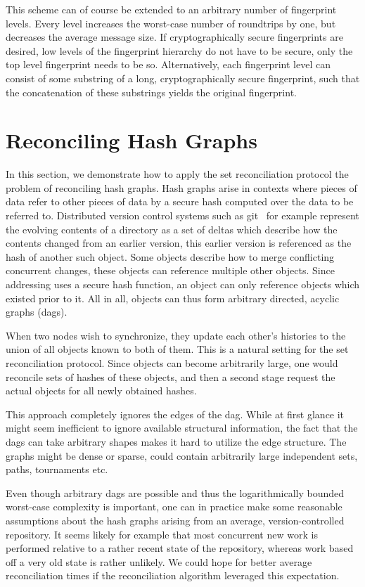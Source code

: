 This scheme can of course be extended to an arbitrary number of fingerprint levels. Every level increases the worst-case number of roundtrips by one, but decreases the average message size. If cryptographically secure fingerprints are desired, low levels of the fingerprint hierarchy do not have to be secure, only the top level fingerprint needs to be so. Alternatively, each fingerprint level can consist of some substring of a long, cryptographically secure fingerprint, such that the concatenation of these substrings yields the original fingerprint.

\section{Reconciling Hash Graphs}
\label{set-reconciliation-graphs}

In this section, we demonstrate how to apply the set reconciliation protocol the problem of reconciling hash graphs. Hash graphs arise in contexts where pieces of data refer to other pieces of data by a secure hash computed over the data to be referred to. Distributed version control systems such as git~\cite{chacon2014pro} for example represent the evolving contents of a directory as a set of deltas which describe how the contents changed from an earlier version, this earlier version is referenced as the hash of another such object. Some objects describe how to merge conflicting concurrent changes, these objects can reference multiple other objects. Since addressing uses a secure hash function, an object can only reference objects which existed prior to it. All in all, objects can thus form arbitrary directed, acyclic graphs (dags).

When two nodes wish to synchronize, they update each other's histories to the union of all objects known to both of them. This is a natural setting for the set reconciliation protocol. Since objects can become arbitrarily large, one would reconcile sets of hashes of these objects, and then a second stage request the actual objects for all newly obtained hashes.

This approach completely ignores the edges of the dag. While at first glance it might seem inefficient to ignore available structural information, the fact that the dags can take arbitrary shapes makes it hard to utilize the edge structure. The graphs might be dense or sparse, could contain arbitrarily large independent sets, paths, tournaments etc.

Even though arbitrary dags are possible and thus the logarithmically bounded worst-case complexity is important, one can in practice make some reasonable assumptions about the hash graphs arising from an average, version-controlled repository. It seems likely for example that most concurrent new work is performed relative to a rather recent state of the repository, whereas work based off a very old state is rather unlikely. We could hope for better average reconciliation times if the reconciliation algorithm leveraged this expectation.

